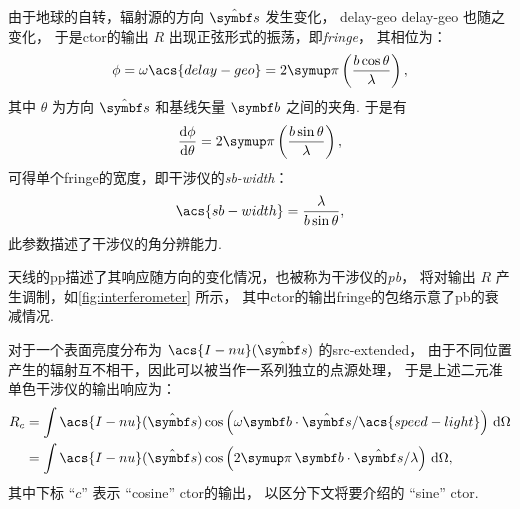 由于地球的自转，辐射源的方向 $\hat{\B{s}}$ 发生变化，
\acl{delay-geo} \acs{delay-geo} 也随之变化，
于是\ac{ctor}的输出 $R$ 出现正弦形式的振荡，即\emph{\acf{fringe}}，
其相位为：
\begin{equation}
  \phi = \omega \acs{delay-geo}
    = 2\Cpi \left( \frac{b \cos\theta}{\lambda} \right),
\end{equation}
其中 $\theta$ 为方向 $\hat{\B{s}}$ 和基线矢量 $\B{b}$ 之间的夹角.
于是有
\begin{equation}
  \diff{\phi}{\theta} = 2\Cpi \left( \frac{b \sin\theta}{\lambda} \right),
\end{equation}
可得单个\ac{fringe}的宽度，即干涉仪的\emph{\acf{sb-width}}：
\begin{equation}
  \label{eq:sb-width}
  \acs{sb-width} = \frac{\lambda}{b \sin\theta},
\end{equation}
此参数描述了干涉仪的角分辨能力.

天线的\ac{pp}描述了其响应随方向的变化情况，也被称为干涉仪的\emph{\acf{pb}}，
将对输出 $R$ 产生调制，如\autoref{fig:interferometer} 所示，
其中\ac{ctor}的输出\ac{fringe}的包络示意了\ac{pb}的衰减情况.

对于一个表面亮度分布为 $\acs{I-nu}(\hat{\B{s}})$ 的\ac{src-extended}，
由于不同位置产生的辐射互不相干，因此可以被当作一系列独立的点源处理，
于是上述二元准单色干涉仪的输出响应为：
\begin{align}
  \label{eq:resp-cos}
  R_c & = \int \acs{I-nu}(\hat{\B{s}})
      \cos \left( \omega \B{b}\cdot\hat{\B{s}} / \acs{speed-light} \right)
      \,\D{\Omega}  \\
    & = \int \acs{I-nu}(\hat{\B{s}}) \cos \left(
      2\Cpi\, \B{b}\cdot\hat{\B{s}} / \lambda \right) \,\D{\Omega},
\end{align}
其中下标 \enquote{$c$} 表示 \enquote{cosine} \ac{ctor}的输出，
以区分下文将要介绍的 \enquote{sine} \ac{ctor}.

